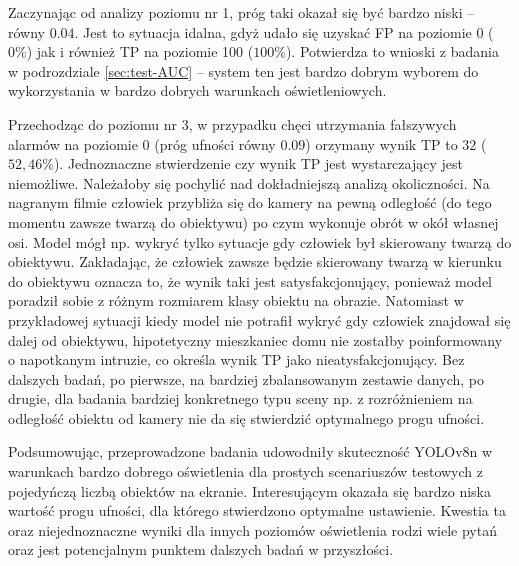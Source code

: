 Zaczynając od analizy poziomu nr 1, próg taki okazał się być bardzo niski -- równy $0.04$. Jest to sytuacja idalna, gdyż udało się uzyskać FP na poziomie 0 ($0\%$) jak i również TP na poziomie 100 ($100\%$). Potwierdza to wnioski z badania w podrozdziale \ref{sec:test-AUC} -- system ten jest bardzo dobrym wyborem do wykorzystania w bardzo dobrych warunkach oświetleniowych.

Przechodząc do poziomu nr 3, w przypadku chęci utrzymania fałszywych alarmów na poziomie $0$ (próg ufności równy $0.09$) orzymany wynik TP to $32$ ($52,46\%$). Jednoznaczne stwierdzenie czy wynik TP jest wystarczający jest niemożliwe. Należałoby się pochylić nad dokładniejszą analizą okoliczności. Na nagranym filmie człowiek przybliża się do kamery na pewną odległość (do tego momentu zawsze twarzą do obiektywu) po czym wykonuje obrót w okół własnej osi.
Model mógł np. wykryć tylko sytuacje gdy człowiek był skierowany twarzą do obiektywu. Zakładając, że człowiek zawsze będzie skierowany twarzą w kierunku do obiektywu oznacza to, że wynik taki jest satysfakcjonujący, ponieważ model poradził sobie z różnym rozmiarem klasy obiektu na obrazie. Natomiast w przykładowej sytuacji kiedy model nie potrafił wykryć gdy człowiek znajdował się dalej od obiektywu, hipotetyczny mieszkaniec domu nie zostałby poinformowany o napotkanym intruzie, co określa wynik TP jako nieatysfakcjonujący. Bez dalszych badań, po pierwsze, na bardziej zbalansowanym zestawie danych, po drugie, dla badania bardziej konkretnego typu sceny np. z rozróżnieniem na odległość obiektu od kamery nie da się stwierdzić optymalnego progu ufności.

Podsumowując, przeprowadzone badania udowodniły skuteczność YOLOv8n w warunkach bardzo dobrego oświetlenia dla prostych scenariuszów testowych z pojedyńczą liczbą obiektów na ekranie. Interesującym okazała się bardzo niska wartość progu ufności, dla którego stwierdzono optymalne ustawienie. Kwestia ta oraz niejednoznaczne wyniki dla innych poziomów oświetlenia rodzi wiele pytań oraz jest potencjalnym punktem dalszych badań w przyszłości.





